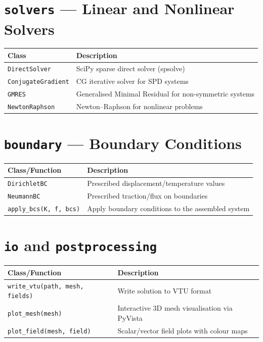 \documentclass[11pt,a4paper]{report}
\begin{document}
\section{\texttt{solvers} --- Linear and Nonlinear Solvers}

\begin{longtable}{lp{9cm}}
\toprule
\textbf{Class} & \textbf{Description} \\
\midrule
\texttt{DirectSolver} & SciPy sparse direct solver (spsolve) \\
\texttt{ConjugateGradient} & CG iterative solver for SPD systems \\
\texttt{GMRES} & Generalised Minimal Residual for non-symmetric systems \\
\texttt{NewtonRaphson} & Newton--Raphson for nonlinear problems \\
\bottomrule
\end{longtable}

\section{\texttt{boundary} --- Boundary Conditions}

\begin{longtable}{lp{9cm}}
\toprule
\textbf{Class/Function} & \textbf{Description} \\
\midrule
\texttt{DirichletBC} & Prescribed displacement/temperature values \\
\texttt{NeumannBC} & Prescribed traction/flux on boundaries \\
\texttt{apply\_bcs(K, f, bcs)} & Apply boundary conditions to the assembled system \\
\bottomrule
\end{longtable}

\section{\texttt{io} and \texttt{postprocessing}}

\begin{longtable}{lp{9cm}}
\toprule
\textbf{Class/Function} & \textbf{Description} \\
\midrule
\texttt{write\_vtu(path, mesh, fields)} & Write solution to VTU format \\
\texttt{plot\_mesh(mesh)} & Interactive 3D mesh visualisation via PyVista \\
\texttt{plot\_field(mesh, field)} & Scalar/vector field plots with colour maps \\
\bottomrule
\end{longtable}
\end{document}
